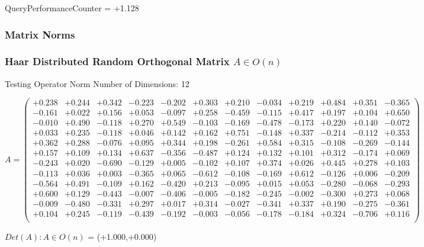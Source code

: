 \documentclass[9pt]{article}
\theoremstyle{plain}
\theoremstyle{definition}
\theoremstyle{remark}
\numberwithin{equation}{section}
\begin{document}
QueryPerformanceCounter  =  +1.128
\subsubsection{Matrix Norms}
\subsubsection{Haar Distributed Random Orthogonal Matrix $A \in O(n)$}
 Testing Operator Norm
Number of Dimensions: 12

$A = \left(
\begin{array}{
cccccccccccc}
+0.238 & +0.244 & +0.342 & -0.223 & -0.202 & +0.303 & +0.210 & -0.034 & +0.219 & +0.484 & +0.351 & -0.365 \\
-0.161 & +0.022 & +0.156 & +0.053 & -0.097 & +0.258 & -0.459 & -0.115 & +0.417 & +0.197 & +0.104 & +0.650 \\
-0.010 & +0.490 & -0.118 & +0.270 & +0.549 & -0.103 & -0.169 & -0.478 & -0.173 & +0.220 & +0.140 & -0.072 \\
+0.033 & +0.235 & -0.118 & +0.046 & +0.142 & +0.162 & +0.751 & -0.148 & +0.337 & -0.214 & -0.112 & +0.353 \\
+0.362 & +0.288 & -0.076 & +0.095 & +0.344 & +0.198 & -0.261 & +0.584 & +0.315 & -0.108 & -0.269 & -0.144 \\
+0.157 & +0.109 & +0.134 & +0.637 & -0.356 & -0.487 & +0.124 & +0.132 & +0.101 & +0.312 & -0.174 & +0.069 \\
-0.243 & +0.020 & -0.690 & -0.129 & +0.005 & -0.102 & +0.107 & +0.374 & +0.026 & +0.445 & +0.278 & +0.103 \\
-0.113 & +0.036 & +0.003 & -0.365 & +0.065 & -0.612 & -0.108 & -0.169 & +0.612 & -0.126 & +0.006 & -0.209 \\
-0.564 & +0.491 & -0.109 & +0.162 & -0.420 & +0.213 & -0.095 & +0.015 & +0.053 & -0.280 & -0.068 & -0.293 \\
+0.600 & +0.129 & -0.443 & -0.007 & -0.406 & -0.005 & -0.182 & -0.245 & -0.002 & -0.300 & +0.273 & +0.068 \\
-0.009 & -0.480 & -0.331 & +0.297 & +0.017 & +0.314 & -0.027 & -0.341 & +0.337 & +0.190 & -0.275 & -0.361 \\
+0.104 & +0.245 & -0.119 & -0.439 & -0.192 & -0.003 & -0.056 & -0.178 & -0.184 & +0.324 & -0.706 & +0.116 \\
\end{array}
\right)$ \newline 

$Det(A) :   A \in O(n)$ = (+1.000,+0.000)
\end{document}
